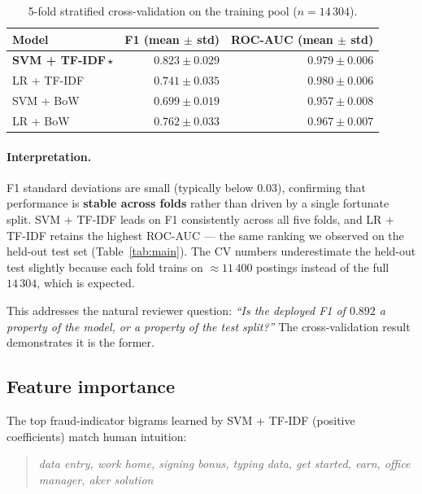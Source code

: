 \documentclass[11pt,a4paper]{article}
\begin{document}
\begin{table}[H]
\centering
\caption{5-fold stratified cross-validation on the training pool ($n = 14\,304$).}
\label{tab:cv}
\begin{tabular}{l r r}
\toprule
\textbf{Model} & \textbf{F1 (mean $\pm$ std)} & \textbf{ROC-AUC (mean $\pm$ std)} \\
\midrule
\textbf{SVM + TF-IDF}\,$\star$ & $\mathbf{0.823 \pm 0.029}$ & $0.979 \pm 0.006$ \\
LR + TF-IDF                   & $0.741 \pm 0.035$         & $\mathbf{0.980 \pm 0.006}$ \\
SVM + BoW                     & $0.699 \pm 0.019$         & $0.957 \pm 0.008$ \\
LR + BoW                      & $0.762 \pm 0.033$         & $0.967 \pm 0.007$ \\
\bottomrule
\end{tabular}
\end{table}

\paragraph{Interpretation.} F1 standard deviations are small (typically
below $0.03$), confirming that performance is \textbf{stable across folds}
rather than driven by a single fortunate split. SVM + TF-IDF leads on F1
consistently across all five folds, and LR + TF-IDF retains the highest
ROC-AUC --- the same ranking we observed on the held-out test set
(Table~\ref{tab:main}). The CV numbers underestimate the held-out test
slightly because each fold trains on $\approx 11\,400$ postings instead of
the full $14\,304$, which is expected.

This addresses the natural reviewer question: \emph{``Is the deployed F1
of $0.892$ a property of the model, or a property of the test split?''}
The cross-validation result demonstrates it is the former.

\subsection{Feature importance}
\label{sec:featimp}

The top fraud-indicator bigrams learned by SVM + TF-IDF (positive
coefficients) match human intuition:

\begin{quote}\itshape
data entry, work home, signing bonus, typing data, get started,
earn, office manager, aker solution
\end{quote}
\end{document}
